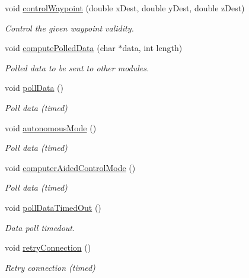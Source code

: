 \begin{DoxyCompactItemize}
\item 
void \hyperlink{class_communication_control_ad542ea19ca17efa73a5f8d3db6963419}{control\-Waypoint} (double x\-Dest, double y\-Dest, double z\-Dest)
\begin{DoxyCompactList}\small\item\em Control the given waypoint validity. \end{DoxyCompactList}\item 
void \hyperlink{class_communication_control_a1648b1e8ddea90d124c0024b236cb024}{compute\-Polled\-Data} (char $\ast$data, int length)
\begin{DoxyCompactList}\small\item\em Polled data to be sent to other modules. \end{DoxyCompactList}\item 
void \hyperlink{class_communication_control_aaddaf7c3e89845a7791e8f0c29805072}{poll\-Data} ()
\begin{DoxyCompactList}\small\item\em Poll data (timed) \end{DoxyCompactList}\item 
void \hyperlink{class_communication_control_a1fd9d5564182805412c21a60a1d7c8e6}{autonomous\-Mode} ()
\begin{DoxyCompactList}\small\item\em Poll data (timed) \end{DoxyCompactList}\item 
void \hyperlink{class_communication_control_a21637edb8cc39ebaacbdfd41a56d1bf4}{computer\-Aided\-Control\-Mode} ()
\begin{DoxyCompactList}\small\item\em Poll data (timed) \end{DoxyCompactList}\item 
void \hyperlink{class_communication_control_a91d026d8686a55061e70d5a1ca1b3f90}{poll\-Data\-Timed\-Out} ()
\begin{DoxyCompactList}\small\item\em Data poll timedout. \end{DoxyCompactList}\item 
void \hyperlink{class_communication_control_ad3783a1d1ccac39dfb76c54c1f925ac5}{retry\-Connection} ()
\begin{DoxyCompactList}\small\item\em Retry connection (timed) \end{DoxyCompactList}\end{DoxyCompactItemize}
